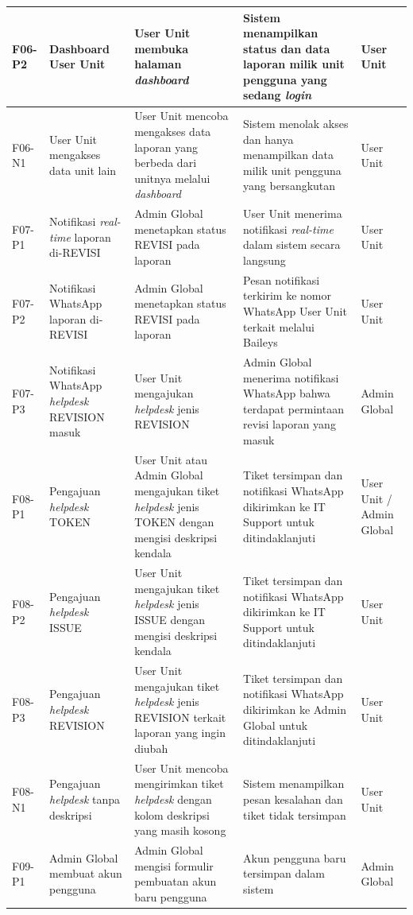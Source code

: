 \begin{longtable}{|p{}|p{}|p{}|p{}|p{}|}
    \hline
    F06-P2 & Dashboard User Unit & User Unit membuka halaman \textit{dashboard} & Sistem menampilkan status dan data laporan milik unit pengguna yang sedang \textit{login} & User Unit \\
    \hline
    F06-N1 & User Unit mengakses data unit lain & User Unit mencoba mengakses data laporan yang berbeda dari unitnya melalui \textit{dashboard} & Sistem menolak akses dan hanya menampilkan data milik unit pengguna yang bersangkutan & User Unit \\
    \hline
    F07-P1 & Notifikasi \textit{real-time} laporan di-REVISI & Admin Global menetapkan status REVISI pada laporan & User Unit menerima notifikasi \textit{real-time} dalam sistem secara langsung & User Unit \\
    \hline
    F07-P2 & Notifikasi WhatsApp laporan di-REVISI & Admin Global menetapkan status REVISI pada laporan & Pesan notifikasi terkirim ke nomor WhatsApp User Unit terkait melalui Baileys & User Unit \\
    \hline
    F07-P3 & Notifikasi WhatsApp \textit{helpdesk} REVISION masuk & User Unit mengajukan \textit{helpdesk} jenis REVISION & Admin Global menerima notifikasi WhatsApp bahwa terdapat permintaan revisi laporan yang masuk & Admin Global \\
    \hline
    F08-P1 & Pengajuan \textit{helpdesk} TOKEN & User Unit atau Admin Global mengajukan tiket \textit{helpdesk} jenis TOKEN dengan mengisi deskripsi kendala & Tiket tersimpan dan notifikasi WhatsApp dikirimkan ke IT Support untuk ditindaklanjuti & User Unit / Admin Global \\
    \hline
    F08-P2 & Pengajuan \textit{helpdesk} ISSUE & User Unit mengajukan tiket \textit{helpdesk} jenis ISSUE dengan mengisi deskripsi kendala & Tiket tersimpan dan notifikasi WhatsApp dikirimkan ke IT Support untuk ditindaklanjuti & User Unit \\
    \hline
    F08-P3 & Pengajuan \textit{helpdesk} REVISION & User Unit mengajukan tiket \textit{helpdesk} jenis REVISION terkait laporan yang ingin diubah & Tiket tersimpan dan notifikasi WhatsApp dikirimkan ke Admin Global untuk ditindaklanjuti & User Unit \\
    \hline
    F08-N1 & Pengajuan \textit{helpdesk} tanpa deskripsi & User Unit mencoba mengirimkan tiket \textit{helpdesk} dengan kolom deskripsi yang masih kosong & Sistem menampilkan pesan kesalahan dan tiket tidak tersimpan & User Unit \\
    \hline
    F09-P1 & Admin Global membuat akun pengguna & Admin Global mengisi formulir pembuatan akun baru pengguna & Akun pengguna baru tersimpan dalam sistem & Admin Global \\

\end{longtable}
